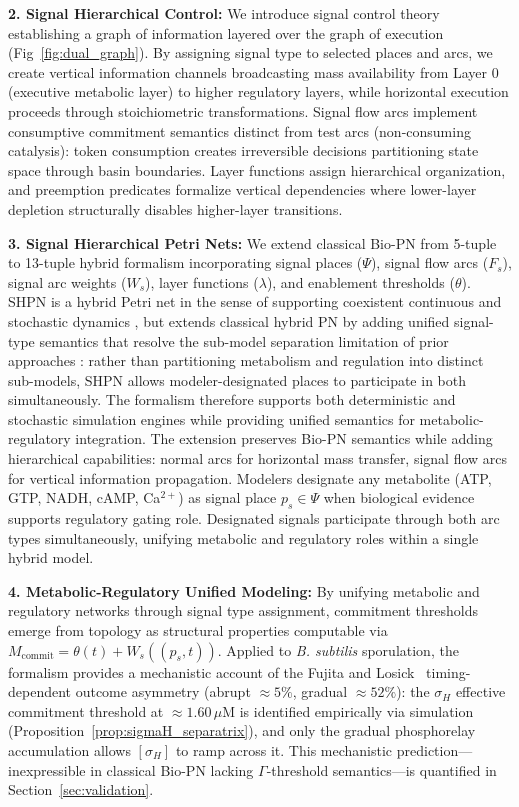 \documentclass[10pt,letterpaper]{article}
\begin{document}
\textbf{2. Signal Hierarchical Control:} We introduce signal control theory establishing a graph of information layered over the graph of execution (Fig~\ref{fig:dual_graph}). By assigning signal type to selected places and arcs, we create vertical information channels broadcasting mass availability from Layer 0 (executive metabolic layer) to higher regulatory layers, while horizontal execution proceeds through stoichiometric transformations. Signal flow arcs implement consumptive commitment semantics distinct from test arcs (non-consuming catalysis): token consumption creates irreversible decisions partitioning state space through basin boundaries. Layer functions assign hierarchical organization, and preemption predicates formalize vertical dependencies where lower-layer depletion structurally disables higher-layer transitions.

\textbf{3. Signal Hierarchical Petri Nets:} We extend classical Bio-PN \cite{reisig1985,koch2011} from 5-tuple to 13-tuple hybrid formalism incorporating signal places ($\Psi$), signal flow arcs ($F_s$), signal arc weights ($W_s$), layer functions ($\lambda$), and enablement thresholds ($\theta$). SHPN is a hybrid Petri net in the sense of supporting coexistent continuous and stochastic dynamics \cite{alla1998,matsuno2003}, but extends classical hybrid PN by adding unified signal-type semantics that resolve the sub-model separation limitation of prior approaches \cite{liu2013}: rather than partitioning metabolism and regulation into distinct sub-models, SHPN allows modeler-designated places to participate in both simultaneously. The formalism therefore supports both deterministic and stochastic simulation engines \cite{goss1998} while providing unified semantics for metabolic-regulatory integration. The extension preserves Bio-PN semantics while adding hierarchical capabilities: normal arcs for horizontal mass transfer, signal flow arcs for vertical information propagation. Modelers designate any metabolite (ATP, GTP, NADH, cAMP, Ca$^{2+}$) as signal place $p_s \in \Psi$ when biological evidence supports regulatory gating role. Designated signals participate through both arc types simultaneously, unifying metabolic and regulatory roles within a single hybrid model.

\textbf{4. Metabolic-Regulatory Unified Modeling:} By unifying metabolic and regulatory networks through signal type assignment, commitment thresholds emerge from topology as structural properties computable via $M_{\text{commit}} = \theta(t) + W_s((p_s,t))$. Applied to \textit{B. subtilis} sporulation, the formalism provides a mechanistic account of the Fujita and Losick~\cite{fujita2005} timing-dependent outcome asymmetry (abrupt $\approx 5\%$, gradual $\approx 52\%$): the $\sigma_H$ effective commitment threshold at $\approx 1.60\,\mu$M is identified empirically via simulation (Proposition~\ref{prop:sigmaH_separatrix}), and only the gradual phosphorelay accumulation allows $[\sigma_H]$ to ramp across it. This mechanistic prediction---inexpressible in classical Bio-PN lacking $\Gamma$-threshold semantics---is quantified in Section~\ref{sec:validation}.
\end{document}
